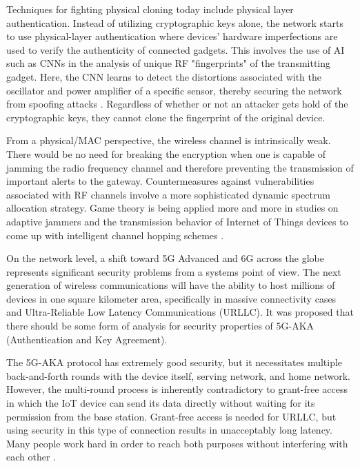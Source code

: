 \documentclass[12pt]{article}
\begin{document}
    Techniques for fighting physical cloning today include physical layer authentication. Instead of utilizing cryptographic keys alone, the network starts to use physical-layer authentication where devices' hardware imperfections are used to verify the authenticity of connected gadgets. This involves the use of AI such as CNNs in the analysis of unique RF "fingerprints" of the transmitting gadget. Here, the CNN learns to detect the distortions associated with the oscillator and power amplifier of a specific sensor, thereby securing the network from spoofing attacks \cite{QIU20252025}. Regardless of whether or not an attacker gets hold of the cryptographic keys, they cannot clone the fingerprint of the original device.

        From a physical/MAC perspective, the wireless channel is intrinsically weak. There would be no need for breaking the encryption when one is capable of jamming the radio frequency channel and therefore preventing the transmission of important alerts to the gateway. Countermeasures against vulnerabilities associated with RF channels involve a more sophisticated dynamic spectrum allocation strategy. Game theory is being applied more and more in studies on adaptive jammers and the transmission behavior of Internet of Things devices to come up with intelligent channel hopping schemes \cite{namvar2016jamminginternetthingsgametheoretic}.

    On the network level, a shift toward 5G Advanced and 6G across the globe represents significant security problems from a systems point of view. The next generation of wireless communications will have the ability to host millions of devices in one square kilometer area, specifically in massive connectivity cases and Ultra-Reliable Low Latency Communications (URLLC). It was proposed that there should be some form of analysis for security properties of 5G-AKA (Authentication and Key Agreement).

     The 5G-AKA protocol has extremely good security, but it necessitates multiple back-and-forth rounds with the device itself, serving network, and home network. However, the multi-round process is inherently contradictory to grant-free access in which the IoT device can send its data directly without waiting for its permission from the base station. Grant-free access is needed for URLLC, but using security in this type of connection results in unacceptably long latency. Many people work hard in order to reach both purposes without interfering with each other \cite{Liu_2023_FormalAnalysis, Liu2020AnalyzingGA}.
\end{document}

